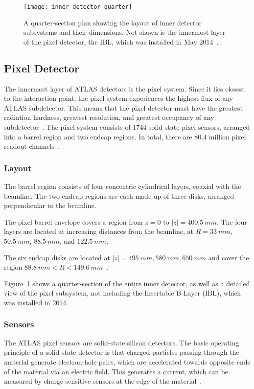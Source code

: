 \begin{figure}[!ht]\centering
\texttt{[image: inner\_detector\_quarter]}
\caption{A quarter-section plan showing the layout of inner detector subsystems and their dimensions.
Not shown is the innermost layer of the pixel detector, the IBL, which was installed in May 2014~\cite{lhc-machine-2008}.}
\label{fig:inner_detector_quarter}
\end{figure}

\subsection{Pixel Detector}\label{subsec:pixel}

The innermost layer of ATLAS detectors is the pixel system.
Since it lies closest to the interaction point, the pixel system experiences the highest flux of any ATLAS subdetector.
This means that the pixel detector must have the greatest radiation hardness, greatest resolution,
and greatest occupancy of any subdetector~\cite{atlas-detector-2008}.
The pixel system consists of 1744 solid-state pixel sensors, arranged into a barrel region and two endcap regions.
In total, there are 80.4 million pixel readout channels~\cite{atlas-detector-2008}.

\subsubsection{Layout}
The barrel region consists of four concentric cylindrical layers, coaxial with the beamline.
The two endcap regions are each made up of three disks, arranged perpendicular to the beamline.

The pixel barrel envelope covers a region from $z = 0$ to $|z|  = 400.5~mm$.
The four layers are located at increasing distances from the beamline, at $R = 33~mm$, $50.5~mm$, $88.5~mm$, and $122.5~mm$.

The six endcap disks are located at $|z| = 495~mm, 580~mm, 650~mm$ and cover the region $88.8~mm < R < 149.6~mm$~\cite{atlas-detector-2008}.

Figure~\ref{fig:inner_detector_quarter} shows a quarter-section of
the entire inner detector, as well as a detailed view of the pixel
subsystem, not including the Insertable B Layer (IBL), which was
installed in 2014.

\subsubsection{Sensors}
The ATLAS pixel sensors are solid-state silicon detectors.
The basic operating principle of a solid-state detector is that charged particles passing through the material
generate electron-hole pairs, which are accelerated towards opposite ends of the material via an electric field.
This generates a current, which can be measured by charge-sensitive sensors at the edge of the material~\cite{spieler-2005}.

